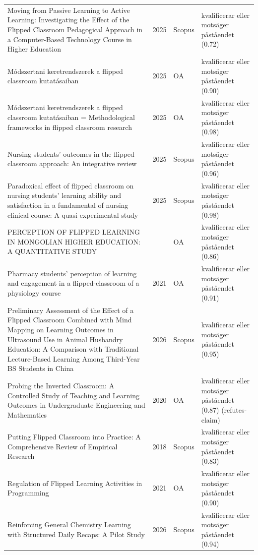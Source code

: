 \begin{longtable}{@{}%
  >{\raggedright\arraybackslash}p{}c%
  >{\raggedright\arraybackslash}p{}%
  >{\raggedright\arraybackslash}p{}@{}}
Moving from Passive Learning to Active Learning: Investigating the Effect of the Flipped Classroom Pedagogical Approach in a Computer-Based Technology Course in Higher Education & 2025 & Scopus & kvalificerar eller motsäger påståendet (0.72) \\
Módszertani keretrendszerek a flipped classroom kutatásaiban & 2025 & OA & kvalificerar eller motsäger påståendet (0.90) \\
Módszertani keretrendszerek a flipped classroom kutatásaiban = Methodological frameworks in flipped classroom research & 2025 & OA & kvalificerar eller motsäger påståendet (0.98) \\
Nursing students' outcomes in the flipped classroom approach: An integrative review & 2025 & Scopus & kvalificerar eller motsäger påståendet (0.96) \\
Paradoxical effect of flipped classroom on nursing students' learning ability and satisfaction in a fundamental of nursing clinical course: A quasi-experimental study & 2025 & Scopus & kvalificerar eller motsäger påståendet (0.98) \\
PERCEPTION OF FLIPPED LEARNING IN MONGOLIAN HIGHER EDUCATION: A QUANTITATIVE STUDY &  & OA & kvalificerar eller motsäger påståendet (0.86) \\
Pharmacy students' perception of learning and engagement in a flipped-classroom of a physiology course & 2021 & OA & kvalificerar eller motsäger påståendet (0.91) \\
Preliminary Assessment of the Effect of a Flipped Classroom Combined with Mind Mapping on Learning Outcomes in Ultrasound Use in Animal Husbandry Education: A Comparison with Traditional Lecture-Based Learning Among Third-Year BS Students in China & 2026 & Scopus & kvalificerar eller motsäger påståendet (0.95) \\
Probing the Inverted Classroom: A Controlled Study of Teaching and Learning Outcomes in Undergraduate Engineering and Mathematics & 2020 & OA & kvalificerar eller motsäger påståendet (0.87) (refutes-claim) \\
Putting Flipped Classroom into Practice: A Comprehensive Review of Empirical Research & 2018 & Scopus & kvalificerar eller motsäger påståendet (0.83) \\
Regulation of Flipped Learning Activities in Programming & 2021 & OA & kvalificerar eller motsäger påståendet (0.90) \\
Reinforcing General Chemistry Learning with Structured Daily Recaps: A Pilot Study & 2026 & Scopus & kvalificerar eller motsäger påståendet (0.94) \\

\end{longtable}
